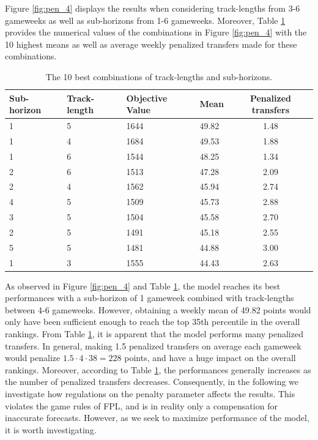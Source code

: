 Figure \ref{fig:pen_4} displays the results when considering track-lengths from 3-6 gameweeks as well as sub-horizons from 1-6 gameweeks.  Moreover, Table \ref{tab:pen_4_ill_trans} provides the numerical values of the combinations in Figure \ref{fig:pen_4} with the 10 highest means as well as average weekly penalized transfers made for these combinations.




\begin{table}[H]
\centering
\begin{tabular}{|l|l|l|l|c|}
\hline
Sub-horizon & Track-length & Objective Value & Mean & Penalized transfers \\
\hline
1       & 5          & 1644             & 49.82 & 1.48       \\
1       & 4          & 1684             & 49.53 & 1.88       \\
1       & 6          & 1544             & 48.25 & 1.34       \\
2       & 6          & 1513             & 47.28 & 2.09       \\
2       & 4          & 1562             & 45.94 & 2.74       \\
4       & 5          & 1509             & 45.73 & 2.88       \\
3       & 5          & 1504             & 45.58 & 2.70       \\
2       & 5          & 1491             & 45.18 & 2.55       \\
5       & 5          & 1481             & 44.88 & 3.00       \\
1       & 3          & 1555             & 44.43 & 2.63       \\
\hline
\end{tabular}
\caption{The 10 best combinations of track-lengths and sub-horizons.}
\label{tab:pen_4_ill_trans}
\end{table}


As observed in Figure \ref{fig:pen_4} and Table \ref{tab:pen_4_ill_trans}, the model reaches its best performances with a sub-horizon of 1 gameweek combined with track-lengths between 4-6 gameweeks. However, obtaining a weekly mean of 49.82 points would only have been sufficient enough to reach the top 35th percentile in the overall rankings. From Table \ref{tab:pen_4_ill_trans}, it is apparent that the model performs many penalized transfers. In general, making 1.5 penalized transfers on average each gameweek would penalize $1.5\cdot4\cdot38 = 228$ points, and have a huge impact on the overall rankings. Moreover, according to Table \ref{tab:pen_4_ill_trans}, the performances generally increases as the number of penalized transfers decreases. Consequently, in the following we investigate how regulations on the penalty parameter affects the results. This violates the game rules of FPL, and is in reality only a compensation for inaccurate forecasts. However, as we seek to maximize performance of the model, it is worth investigating. 


